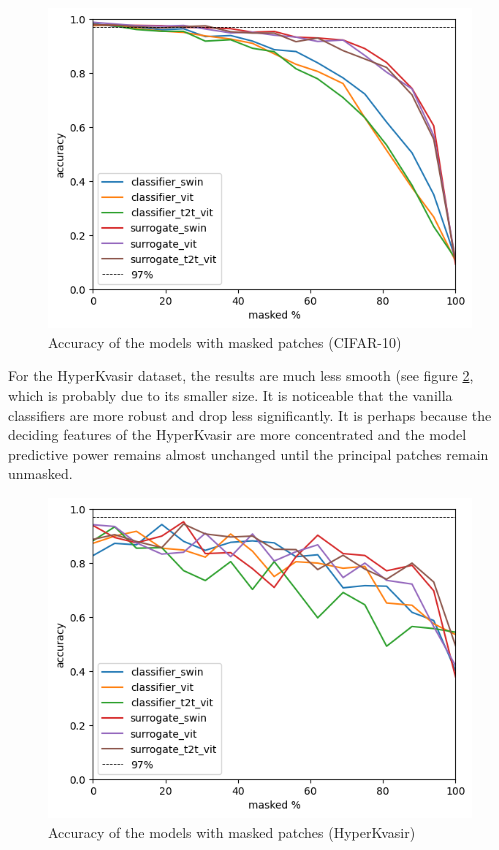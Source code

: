 \documentclass[magisterska,en]{pracamgr}
\begin{document}
\begin{figure}[H]
\centering
\includegraphics[scale=0.8]{./images/masked_accuracy.png}
\caption{Accuracy of the models with masked patches (CIFAR-10)}
\label{masked_accuracy}
\end{figure}


For the HyperKvasir dataset, the results are much less smooth (see figure \ref{gastro_masked_accuracy}, which is probably due to its smaller size. It is noticeable that the vanilla classifiers are more robust and drop less significantly. It is perhaps because the deciding features of the HyperKvasir are more concentrated and the model predictive power remains almost unchanged until the principal patches remain unmasked.


\begin{figure}[H]
\centering
\includegraphics[scale=0.8]{./images/gastro_masked_accuracy.png}
\caption{Accuracy of the models with masked patches (HyperKvasir)}
\label{gastro_masked_accuracy}
\end{figure}
\end{document}
